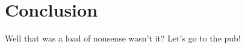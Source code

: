 \chapter{Conclusion} %
\label{chap:Conclusion}

\note
{
	Well that was a load of nonsense wasn't it? Let's go to the pub!
}

